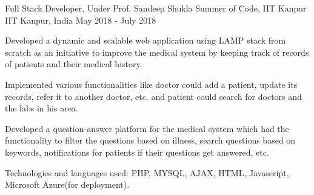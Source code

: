 \begin{cventries}
  \cventry
    {Full Stack Developer, Under Prof. Sandeep Shukla}
    {Summer of Code, IIT Kanpur}
    {IIT Kanpur, India}
    {May 2018 - July 2018}
    {
      \begin{cvitems}
        \item {Developed a dynamic and scalable web application using LAMP stack from scratch as an initiative to improve the medical system by keeping track of records of patients and their medical history.}
        \item {Implemented various functionalities like doctor could add a patient, update its records, refer it to another doctor, etc. and patient could search for doctors and the labs in his area.}
        \item {Developed a question-answer platform for the medical
system which had the functionality to filter the questions based on illness, search questions based on keywords, notifications for patients if their questions get answered, etc.}
        \item{Technologies and languages used: PHP, MYSQL, AJAX, HTML, Javascript, Microsoft Azure(for deployment).}
      \end{cvitems}
    }
   
  
\end{cventries}